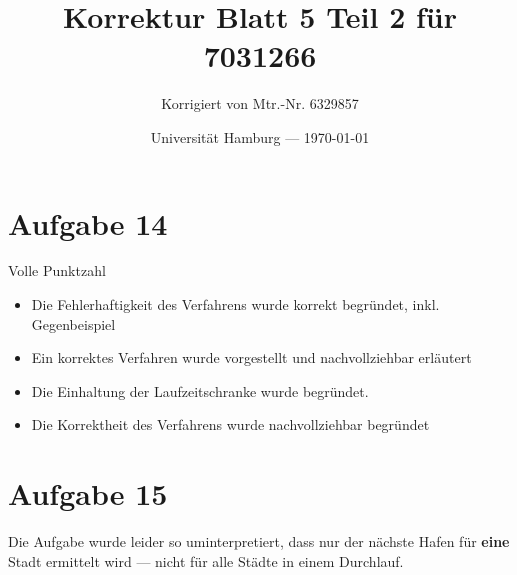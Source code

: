 \documentclass[parskip=half,a4paper]{scrartcl}
\title{Korrektur Blatt 5 Teil 2 für 7031266}
\author{Korrigiert von Mtr.-Nr. 6329857}
\date{Universität Hamburg --- \today}
\begin{document}
\maketitle %



\section{Aufgabe 14}

Volle Punktzahl

\begin{itemize}
    \item Die Fehlerhaftigkeit des Verfahrens wurde korrekt begründet, inkl. Gegenbeispiel
    \item Ein korrektes Verfahren wurde vorgestellt und nachvollziehbar erläutert
    \item Die Einhaltung der Laufzeitschranke wurde begründet.
    \item Die Korrektheit des Verfahrens wurde nachvollziehbar begründet
\end{itemize}

\section{Aufgabe 15}

Die Aufgabe wurde leider so uminterpretiert, dass nur der nächste Hafen für \textbf{eine} Stadt ermittelt wird --- nicht für alle Städte in einem Durchlauf.
\end{document}
